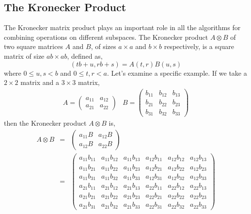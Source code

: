 \documentclass[fleqn,12pt]{article}
\begin{document}
\subsection{The Kronecker Product}
The Kronecker matrix product plays an important role in all the
algorithms for combining operations on different subspaces. The
Kronecker product $A \otimes B$ of two square matrices $A$ and $B$, of
sizes $a \times a$ and $b \times b$ respectively, is a square matrix
of size $a b \times a b$, defined as,
%
\begin{equation}
[A \otimes B] (tb+u, rb+s) = A(t,r) B(u,s)
\end{equation}
%
where $0 \leq u,s < b$ and $0 \leq t,r < a$.  Let's examine a specific
example. If we take a $2 \times 2$ matrix and a $3
\times 3$ matrix,
%
\begin{equation}
\begin{array}{ll}
A = 
\left(
\begin{array}{cc}
a_{11} & a_{12} \\
a_{21} & a_{22} 
\end{array}
\right)
&
B =
\left(
\begin{array}{ccc}
b_{11} & b_{12} & b_{13} \\
b_{21} & b_{22} & b_{23} \\
b_{31} & b_{32} & b_{33} 
\end{array}
\right)
\end{array}
\end{equation}
%
then the Kronecker product $A \otimes B$ is,
%
\begin{eqnarray}
A \otimes B &= &
\left(
\begin{array}{cc}
a_{11} B & a_{12} B \\
a_{12} B & a_{22} B
\end{array}
\right) \\
 &=&
\left(
\begin{array}{cccccc}
a_{11} b_{11} & a_{11} b_{12} & a_{11} b_{13} &
  a_{12} b_{11} & a_{12} b_{12} & a_{12} b_{13} \\
a_{11} b_{21} & a_{11} b_{22} & a_{11} b_{23} &
  a_{12} b_{21} & a_{12} b_{22} & a_{12} b_{23} \\
a_{11} b_{31} & a_{11} b_{32} & a_{11} b_{33} &
  a_{12} b_{31} & a_{12} b_{32} & a_{12} b_{33} \\
a_{21} b_{11} & a_{21} b_{12} & a_{21} b_{13} &
  a_{22} b_{11} & a_{22} b_{12} & a_{22} b_{13} \\
a_{21} b_{21} & a_{21} b_{22} & a_{21} b_{23} &
  a_{22} b_{21} & a_{22} b_{22} & a_{22} b_{23} \\
a_{21} b_{31} & a_{21} b_{32} & a_{21} b_{33} &
  a_{22} b_{31} & a_{22} b_{32} & a_{22} b_{33}
\end{array}
\right)
\end{eqnarray}
\end{document}
